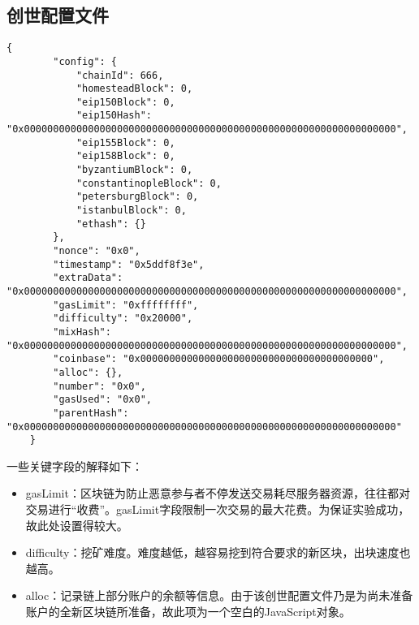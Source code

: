 %
%
%
%
%
%

\begin{appendices}

  \section{创世配置文件}

  \begin{lstlisting}[caption={创世配置文件}, label={lst:创世配置文件}]
    {
        "config": {
            "chainId": 666,
            "homesteadBlock": 0,
            "eip150Block": 0,
            "eip150Hash": "0x0000000000000000000000000000000000000000000000000000000000000000",
            "eip155Block": 0,
            "eip158Block": 0,
            "byzantiumBlock": 0,
            "constantinopleBlock": 0,
            "petersburgBlock": 0,
            "istanbulBlock": 0,
            "ethash": {}
        },
        "nonce": "0x0",
        "timestamp": "0x5ddf8f3e",
        "extraData": "0x0000000000000000000000000000000000000000000000000000000000000000",
        "gasLimit": "0xffffffff",
        "difficulty": "0x20000",
        "mixHash": "0x0000000000000000000000000000000000000000000000000000000000000000",
        "coinbase": "0x0000000000000000000000000000000000000000",
        "alloc": {},
        "number": "0x0",
        "gasUsed": "0x0",
        "parentHash": "0x0000000000000000000000000000000000000000000000000000000000000000"
    }
  \end{lstlisting}

  一些关键字段的解释如下：

  \begin{itemize}
    \item gasLimit：区块链为防止恶意参与者不停发送交易耗尽服务器资源，往往都对交易进行“收费”。gasLimit字段限制一次交易的最大花费。为保证实验成功，故此处设置得较大。
    \item difficulty：挖矿难度。难度越低，越容易挖到符合要求的新区块，出块速度也越高。
    \item alloc：记录链上部分账户的余额等信息。由于该创世配置文件乃是为尚未准备账户的全新区块链所准备，故此项为一个空白的JavaScript对象。
  \end{itemize}


\end{appendices}
